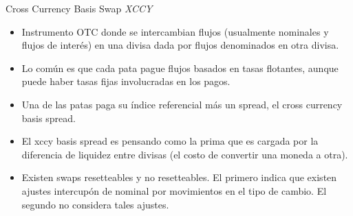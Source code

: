 \documentclass[11pt]{beamer}
\begin{document}
\begin{frame}{Cross Currency Basis Swap \textit{XCCY}}
	\begin{itemize}
		\item Instrumento OTC donde se intercambian flujos (usualmente nominales y flujos de interés) en una divisa dada por flujos denominados en otra divisa.
		\item Lo común es que cada pata pague flujos basados en tasas flotantes, aunque puede haber tasas fijas involucradas en los pagos.
		\item Una de las patas paga su índice referencial más un spread, el cross currency basis spread.
		\item El xccy basis spread es pensando como la prima que es cargada por la diferencia de liquidez entre divisas (el costo de convertir una moneda a otra).
		\item Existen swaps resetteables y no resetteables. El primero indica que existen ajustes intercupón de nominal por movimientos en el tipo de cambio. El segundo no considera tales ajustes.
		
	\end{itemize}
\end{frame}
\end{document}
